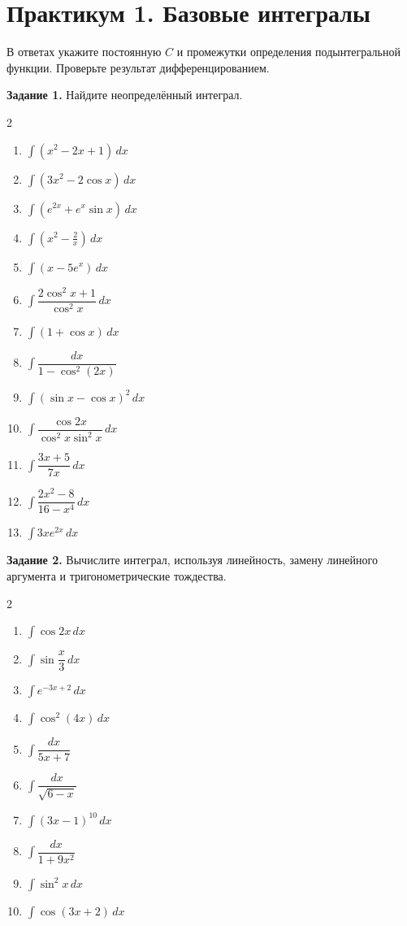 \clearpage
\section*{Практикум 1. Базовые интегралы}
В ответах укажите постоянную $C$ и промежутки определения подынтегральной функции. Проверьте результат дифференцированием.

\textbf{Задание 1.} Найдите неопределённый интеграл.
\begin{multicols}{2}
\begin{enumerate}
\item $\int(x^2-2x+1)\,dx$
\item $\int(3x^2-2\cos x)\,dx$
\item $\int(e^{2x}+e^x\sin x)\,dx$
\item $\int\left(x^2-\frac{2}{x}\right)\,dx$
\item $\int(x-5e^x)\,dx$
\item $\int\dfrac{2\cos^{2}x+1}{\cos^{2}x}\,dx$
\item $\int(1+\cos x)\,dx$
\item $\int\dfrac{dx}{1-\cos^{2}(2x)}$
\item $\int(\sin x-\cos x)^2\,dx$
\item $\int\dfrac{\cos2x}{\cos^{2}x\sin^{2}x}\,dx$
\item $\int\dfrac{3x+5}{7x}\,dx$
\item $\int\dfrac{2x^2-8}{16-x^4}\,dx$
\item $\int3xe^{2x}\,dx$
\end{enumerate}
\end{multicols}
\textbf{Задание 2.} Вычислите интеграл, используя линейность, замену линейного аргумента и тригонометрические тождества.
\begin{multicols}{2}
\begin{enumerate}
\item $\int\cos2x\,dx$
\item $\int\sin\dfrac{x}{3}\,dx$
\item $\int e^{-3x+2}\,dx$
\item $\int\cos^{2}(4x)\,dx$
\item $\int\dfrac{dx}{5x+7}$
\item $\int\dfrac{dx}{\sqrt{6-x}}$
\item $\int(3x-1)^{10}\,dx$
\item $\int\dfrac{dx}{1+9x^2}$
\item $\int\sin^{2}x\,dx$
\item $\int\cos(3x+2)\,dx$
\end{enumerate}
\end{multicols}

